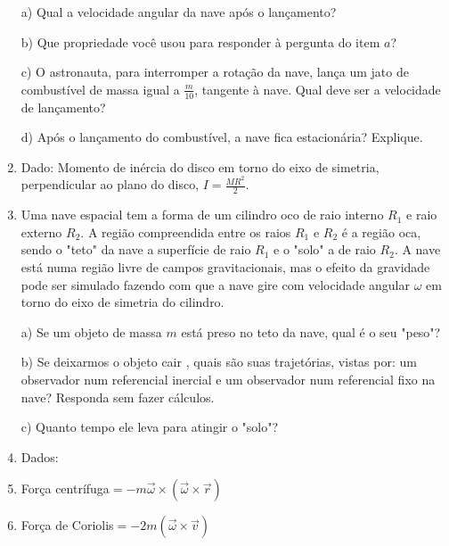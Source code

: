 \begin{enumerate}[start=1,label={\bfseries Q\arabic*.}]
a) Qual a velocidade angular da nave após o lançamento?

\resposta

b) Que propriedade você usou para responder à pergunta do item $a$?

\resposta

c) O astronauta, para interromper a rotação da nave, lança um jato de combustível de massa igual a $\frac{m}{10}$, tangente à nave. Qual deve ser a velocidade de lançamento?

\resposta

d) Após o lançamento do combustível, a nave fica estacionária? Explique.
\item[] Dado: Momento de inércia do disco em torno do eixo de simetria, perpendicular ao plano do disco, $I = \frac{MR^{2}}{2}$.

\resposta


\item Uma nave espacial tem a forma de um cilindro oco de raio interno $R_{1}$ e raio externo $R_{2}$. A região compreendida entre os raios $R_{1}$ e $R_{2}$ é a região oca, sendo o "teto" da nave a superfície de raio $R_{1}$ e o "solo" a de raio $R_{2}$. A nave está numa região livre de campos gravitacionais, mas o efeito da gravidade pode ser simulado fazendo com que a nave gire com velocidade angular $\omega$ em torno do eixo de simetria do cilindro.

a) Se um objeto de massa $m$ está preso no teto da nave, qual é o seu "peso"?

\resposta

b) Se deixarmos o objeto cair , quais são suas trajetórias, vistas por: um observador  num referencial inercial e um observador num referencial fixo na nave? Responda sem fazer cálculos.

\resposta

c) Quanto tempo ele leva para atingir o "solo"?

\item[] Dados:
\item[] Força centrífuga$ = - m \vec{\omega} \times (\vec{\omega} \times \vec{r})$
\item[] Força de Coriolis$ = -2m (\vec{\omega} \times \vec{v})$

\resposta



\end{enumerate}
